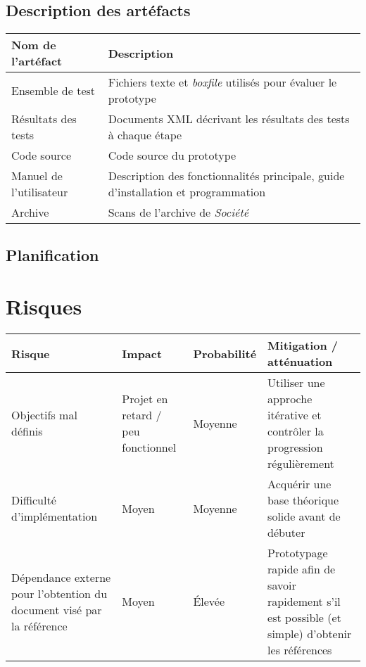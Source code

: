 \subsection{Description des artéfacts}
    \begin{tabular}{| p{4cm} | p{12.75cm} |}
      \hline
        \rowcolor[gray]{.9}
        Nom de l'artéfact & Description \\
        \hline
        Ensemble de test & Fichiers texte et \emph{boxfile} utilisés pour évaluer le prototype \\
        \hline
        Résultats des tests & Documents XML décrivant les résultats des tests à chaque étape \\ 
        \hline
        Code source & Code source du prototype \\
        \hline
        Manuel de l'utilisateur & Description des fonctionnalités principale, guide d'installation et programmation \\
        \hline
        Archive & Scans de l'archive de \emph{Société} \\
      \hline
    \end{tabular}
\subsection{Planification}
\section{Risques}
\begin{tabular}{| p{2.75cm} | p{3.75cm} | p{3.75cm} | p{5.75cm} |}
      \hline
    \rowcolor[gray]{.9} 
    Risque & Impact & Probabilité & Mitigation / atténuation \\
    \hline
    Objectifs mal définis & Projet en retard / peu fonctionnel & Moyenne & Utiliser une approche itérative et contrôler la progression régulièrement \\
    \hline
    Difficulté d'implémentation & Moyen & Moyenne & Acquérir une base théorique solide avant de débuter \\
    \hline
    Dépendance externe pour l'obtention du document visé par la référence & Moyen & Élevée & Prototypage rapide afin de savoir rapidement s'il est possible (et simple) d'obtenir les références \\
      \hline
\end{tabular}

